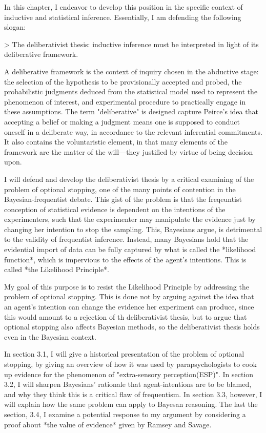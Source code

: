 In this chapter, I endeavor to develop this position in the specific
context of inductive and statistical inference. Essentially, I am
defending the following slogan:

\textgreater{} The deliberativist thesis: inductive inference must be
interpreted in light of its deliberative framework.

A deliberative framework is the context of inquiry chosen in the
abductive stage: the selection of the hypothesis to be provisionally
accepted and probed, the probabilistic judgments deduced from the
statistical model used to represent the phenomenon of interest, and
experimental procedure to practically engage in these assumptions. The
term "deliberative" is designed capture Peirce's idea that accepting a
belief or making a judgment means one is supposed to conduct oneself in
a deliberate way, in accordance to the relevant inferential commitments.
It also contains the voluntaristic element, in that many elements of the
framework are the matter of the will---they justified by virtue of being
decision upon.

I will defend and develop the deliberativist thesis by a critical
examining of the problem of optional stopping, one of the many points of
contention in the Bayesian-frequentist debate. This gist of the problem
is that the freqeuntist conception of statistical evidence is dependent
on the intentions of the experimenters, such that the experimenter may
manipulate the evidence just by changing her intention to stop the
sampling. This, Bayesians argue, is detrimental to the validity of
frequentist inference. Instead, many Bayesians hold that the evidential
import of data can be fully captured by what is called the *likelihood
function*, which is impervious to the effects of the agent's intentions.
This is called *the Likelihood Principle*.

My goal of this purpose is to resist the Likelihood Principle by
addressing the problem of optional stopping. This is done not by arguing
against the idea that an agent's intention can change the evidence her
experiment can produce, since this would amount to a rejection of th
deliberativist thesis, but to argue that optional stopping also affects
Bayesian methods, so the deliberativist thesis holds even in the
Bayesian context.

In section 3.1, I will give a historical presentation of the problem of
optional stopping, by giving an overview of how it was used by
parapsychologists to cook up evidence for the phenomenon of
"extra-sensory perception(ESP)". In section 3.2, I will sharpen
Bayesians' rationale that agent-intentions are to be blamed, and why
they think this is a critical flaw of frequentism. In section 3.3,
however, I will explain how the same problem can apply to Bayesan
reasoning. The last the section, 3.4, I examine a potential response to
my argument by considering a proof about *the value of evidence* given
by Ramsey and Savage.

